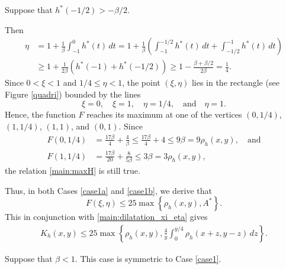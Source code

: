 \documentclass{amsart}
\theoremstyle{plain}
\theoremstyle{definition}
\newenvironment{case}[1]
  {\renewcommand\theinnercustomthm{#1}\innercustomthm}
  {\endinnercustomthm}
\theoremstyle{remark}
\numberwithin{equation}{section}
\numberwithin{theorem}{section}
\numberwithin{conjecture}{section}
\newcommand{\1}{\mathbf 1}
\begin{document}
\bigskip

\begin{case}{1(b)}\label{case1b}
Suppose that $h^*(-1/2)>-\beta /2$.
\end{case}

\noindent 
Then 
\begin{align}
\eta&= 1+ \frac{1}{\beta}\int_{-1}^0 h^*(t)\,dt=1+\frac{1}{\beta}\left(\int_{-1}^{-1/2} h^*(t)\,dt+\int_{-1/2}^{-1} h^*(t)\,dt\right) \nonumber \\
&\ge 1+\frac{1}{2\beta}(h^*(-1)+h^*(-1/2))\ge 1-\frac{\beta+\beta/2}{2\beta}=\frac{1}{4}. \nonumber
\end{align}
Since $0<\xi<1$ and $1/4\le \eta <1$, the point $(\xi, \eta)$ lies in the rectangle (see Figure \ref{quadri}) bounded by the lines
\[\xi=0,\quad \xi=1,\quad  \eta=1/4,\quad \textrm{and}\quad \eta=1.\]
Hence, the function $F$ reaches its maximum at one of the vertices $(0,1/4)$, $(1,1/4)$, $(1,1)$, and $(0,1)$. Since
\begin{align*}
F(0,1/4)&=\frac{17\beta}{4}+\frac{4}{\beta}\le \frac{17\beta}{4}+4\le 9\beta =9\rho_h (x,y),\quad \textrm{and}\\
F(1,1/4)&=\frac{17\beta}{20}+\frac{8}{5\beta}\le3\beta=3\rho_h (x,y),
\end{align*}
the relation \eqref{main:maxH} is still true. 

\bigskip

Thus, in both Cases \ref{case1a} and \ref{case1b}, we derive that 
\[F(\xi,\eta)\le 25 \max \left\{\rho_h(x,y), A^*\right\}.\]
This in conjunction with \eqref{main:dilatation_xi_eta} gives
\begin{align}\label{main:estimatecase1}
K_h(x,y)\le 25 \max \left\{ \rho_h (x,y), \frac{4}{y}\int_0^{y/4} \rho_{h}(x+z,y-z)\,dz \right\}. 
\end{align}

\bigskip

\begin{case}{2}\label{case2}
Suppose that $\beta<1$. This case is symmetric to Case \ref{case1}.
\end{case}
\end{document}
